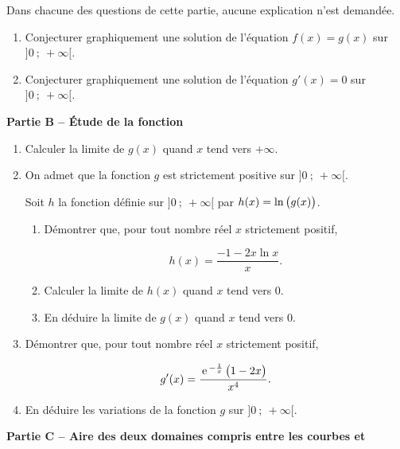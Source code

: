 \documentclass[10pt,a4paper]{article}
\newcommand{\e}{\mathrm{\,e\,}}%
\begin{document}
\medskip

Dans chacune des questions de cette partie, aucune explication n'est demandée.

\begin{enumerate}
\item Conjecturer graphiquement une solution de l'équation $f(x)=g(x)$ sur $]0~;~+\infty[$.
\item Conjecturer graphiquement une solution de l'équation $g'(x)=0$ sur $]0~;~+\infty[$.
\end{enumerate}

\bigskip

\textbf{Partie B -- Étude de la fonction }

\medskip

\begin{enumerate}
\item Calculer la limite de $g(x)$ quand $x$ tend vers $+\infty$.
\item On admet que la fonction $g$ est strictement positive sur $]0~;~+\infty[$.

Soit $h$ la fonction définie sur $]0~;~+\infty[$ par $h(x)=\ln\left ( g(x) \strut\right )$.

\begin{enumerate}
\item Démontrer que, pour tout nombre réel $x$ strictement positif,

\[h(x)= \dfrac{-1-2x\ln x}{x}.\]
\item Calculer la limite de $h(x)$ quand $x$ tend vers 0.
\item En déduire la limite de $g(x)$ quand $x$ tend vers 0.
\end{enumerate}

\item Démontrer que, pour tout nombre réel $x$ strictement positif,

\[g'(x)= \dfrac{\e^{-\frac{1}{x}}\left (1-2x \strut\right )}{x^4}.\]

\item En déduire les variations de la fonction $g$ sur $]0~;~+\infty[$.
\end{enumerate}

\bigskip

\textbf{Partie C -- Aire des deux domaines compris entre les courbes  et }

\medskip 
\end{document}

